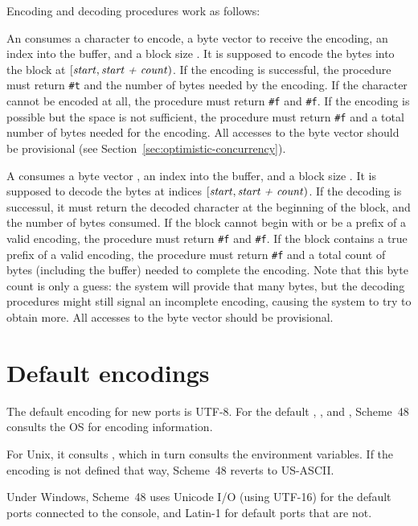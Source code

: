 Encoding and decoding procedures work as follows:
%
\begin{protos}
\end{protos}
%
An  consumes a character  to encode, a
byte vector  to receive the encoding, an index 
into the buffer, and a block size .  It is supposed to
encode the bytes into the block at $\left[\var{start}, \var{start +
    count}\right)$.  If the encoding is successful, the procedure must
return \texttt{\#t} and the number of bytes needed by the encoding.
If the character cannot be encoded at all, the procedure must return
\texttt{\#f} and \texttt{\#f}.  If the encoding is possible but the
space is not sufficient, the procedure must return \texttt{\#f} and a
total number of bytes needed for the encoding.  All
accesses to the byte vector should be provisional (see
Section~\ref{sec:optimistic-concurrency}).

A  consumes a byte vector , an index
 into the buffer, and a block size .  It is
supposed to decode the bytes at indices $\left[\var{start}, \var{start
    + count}\right)$.  If the decoding is successul, it must return
the decoded character at the beginning of the block, and the number of
bytes consumed.  If the block cannot begin with or be a prefix of a
valid encoding, the procedure must return \texttt{\#f} and
\texttt{\#f}.  If the block contains a true prefix of a valid
encoding, the procedure must return \texttt{\#f} and a total count of
bytes (including the buffer) needed to complete the encoding.  Note
that this byte count is only a guess: the system will provide that
many bytes, but the decoding procedures might still signal an
incomplete encoding, causing the system to try to obtain more.  All
accesses to the byte vector should be provisional.

\section{Default encodings}

The default encoding for new ports is UTF-8.  For the default
, , and
, Scheme~48 consults the OS for encoding
information.

For Unix, it consults , which in turn consults
the  environment variables.  If the encoding is not defined
that way, Scheme~48 reverts to US-ASCII.

Under Windows, Scheme~48 uses Unicode I/O (using UTF-16) for the
default ports connected to the console, and Latin-1 for default ports
that are not.

